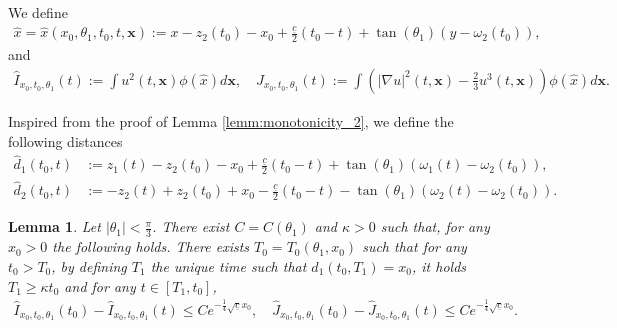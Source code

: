 \documentclass[reqno,10pt]{amsart}
\newtheorem{lemm}{Lemma}[section]
\numberwithin{equation}{section}
\newcommand{\bx}{\mathbf{x}}
\begin{document}
We define
    \begin{align*}
		\hat{x} =\hat{x}\left( x_0,\theta_1, t_0,t,\bx \right) := x-z_2(t_0)-x_0 +\frac{\underline{c}}{2}(t_0-t) +\tan(\theta_1)(y-\omega_2(t_0)),
  \end{align*}
and
  \begin{align}
  \hat{I}_{x_0, t_0,\theta_1} (t) := \int u^2(t,\bx) \phi (\hat{x}) d\bx, \quad \hat{J}_{x_0,t_0,\theta_1}(t) := \int \left( \left\vert \nabla u \right\vert^2 (t,\bx) - \frac23 u^3(t,\bx) \right)\phi(\hat{x}) d\bx.\label{defi:asympt_stab2}
	\end{align}

Inspired from the proof of Lemma \ref{lemm:monotonicity_2}, we define the following distances
\begin{align*}
    \hat{d}_1(t_0,t) & := z_1(t) - z_2(t_0)-x_0 + \frac{\underline{c}}{2}(t_0-t) + \tan(\theta_1) \left( \omega_1(t)- \omega_2(t_0) \right), \\
    \hat{d}_2(t_0,t) & := - z_2(t) + z_2(t_0) + x_0 - \frac{\underline{c}}{2} \left( t_0-t \right) - \tan (\theta_1) \left( \omega_2(t) - \omega_2(t_0) \right).
\end{align*}

\begin{lemm}\label{lemm:limsup2_mass}
    Let $\left\vert \theta_1 \right\vert < \frac{\pi}{3}$. There exist $C=C(\theta_1)$ and $\kappa>0$ such that, for any $x_0>0$ the following holds. There exists $T_0= T_0(\theta_1,x_0)$ such that for any $t_0>T_0$, by defining $T_1$ the unique time such that $\hat{d}_1(t_0,T_1)=x_0$, it holds $ T_1\geq \kappa t_0$ and for any $t\in [T_1, t_0]$,
	\begin{align}\label{eq:mono_mass_in_between}
		\hat{I}_{x_0, t_0,\theta_1} (t_0) - \hat{I}_{x_0, t_0,\theta_1} (t) \leq C e^{-\frac14 \sqrt{\underline{c}} x_0}, \quad \hat{J}_{x_0,t_0,\theta_1}(t_0) - \hat{J}_{x_0,t_0,\theta_1}(t) \leq C e^{-\frac14 \sqrt{\underline{c}} x_0} .
	\end{align}
\end{lemm}
\end{document}
